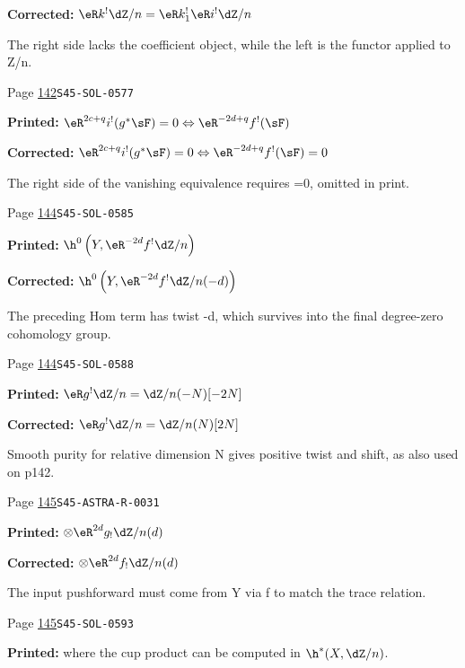 \begin{description}
\par\noindent\textbf{Corrected:} \(\eR k^! \dZ/n=\eR k_1^! \eR i^!\dZ/n\)
\par\noindent The right side lacks the coefficient object, while the left is the functor applied to Z/n.
\smallskip
\item[\hypertarget{apparatus:EN-0068}{68}] Page \hyperlink{printpage:en:142}{142}\quad\texttt{S45-SOL-0577}
\par\noindent\textbf{Printed:} \(\eR^{2 c+q} i^!(g^*\sF)=0\Leftrightarrow \eR^{-2 d+q}f^!(\sF)\)
\par\noindent\textbf{Corrected:} \(\eR^{2 c+q} i^!(g^*\sF)=0\Leftrightarrow \eR^{-2 d+q}f^!(\sF)=0\)
\par\noindent The right side of the vanishing equivalence requires =0, omitted in print.
\smallskip
\item[\hypertarget{apparatus:EN-0069}{69}] Page \hyperlink{printpage:en:144}{144}\quad\texttt{S45-SOL-0585}
\par\noindent\textbf{Printed:} \(\h^0\left(Y,\eR^{-2 d}f^!\dZ/n\right)\)
\par\noindent\textbf{Corrected:} \(\h^0\left(Y,\eR^{-2 d}f^!\dZ/n(-d)\right)\)
\par\noindent The preceding Hom term has twist -d, which survives into the final degree-zero cohomology group.
\smallskip
\item[\hypertarget{apparatus:EN-0070}{70}] Page \hyperlink{printpage:en:144}{144}\quad\texttt{S45-SOL-0588}
\par\noindent\textbf{Printed:} \(\eR g^! \dZ/n=\dZ/n(-N)[-2 N]\)
\par\noindent\textbf{Corrected:} \(\eR g^! \dZ/n=\dZ/n(N)[2 N]\)
\par\noindent Smooth purity for relative dimension N gives positive twist and shift, as also used on p142.
\smallskip
\item[\hypertarget{apparatus:EN-0071}{71}] Page \hyperlink{printpage:en:145}{145}\quad\texttt{S45-ASTRA-R-0031}
\par\noindent\textbf{Printed:} \(\otimes \eR^{2 d} g_!\dZ/n(d)\)
\par\noindent\textbf{Corrected:} \(\otimes \eR^{2 d} f_!\dZ/n(d)\)
\par\noindent The input pushforward must come from Y via f to match the trace relation.
\smallskip
\item[\hypertarget{apparatus:EN-0072}{72}] Page \hyperlink{printpage:en:145}{145}\quad\texttt{S45-SOL-0593}
\par\noindent\textbf{Printed:} where the cup product can be computed in $\h^*(X,\dZ/n)$.

\end{description}
